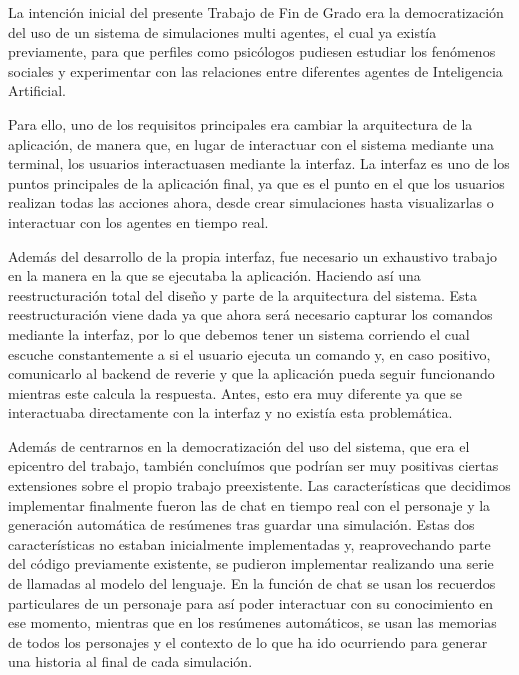 La intención inicial del presente Trabajo de Fin de Grado era la democratización del uso de un sistema de simulaciones multi agentes, el cual ya existía previamente, para que perfiles como psicólogos pudiesen estudiar los fenómenos sociales y experimentar con las relaciones entre diferentes agentes de Inteligencia Artificial.

Para ello, uno de los requisitos principales era cambiar la arquitectura de la aplicación, de manera que, en lugar de interactuar con el sistema mediante una terminal, los usuarios interactuasen mediante la interfaz. La interfaz es uno de los puntos principales de la aplicación final, ya que es el punto en el que los usuarios realizan todas las acciones ahora, desde crear simulaciones hasta visualizarlas o interactuar con los agentes en tiempo real.

Además del desarrollo de la propia interfaz, fue necesario un exhaustivo trabajo en la manera en la que se ejecutaba la aplicación. Haciendo así una reestructuración total del diseño y parte de la arquitectura del sistema. Esta reestructuración viene dada ya que ahora será necesario capturar los comandos mediante la interfaz, por lo que debemos tener un sistema corriendo el cual escuche constantemente a si el usuario ejecuta un comando y, en caso positivo, comunicarlo al backend de reverie y que la aplicación pueda seguir funcionando mientras este calcula la respuesta. Antes, esto era muy diferente ya que se interactuaba directamente con la interfaz y no existía esta problemática.

Además de centrarnos en la democratización del uso del sistema, que era el epicentro del trabajo, también concluímos que podrían ser muy positivas ciertas extensiones sobre el propio trabajo preexistente. Las características que decidimos implementar finalmente fueron las de chat en tiempo real con el personaje y la generación automática de resúmenes tras guardar una simulación. Estas dos características no estaban inicialmente implementadas y, reaprovechando parte del código previamente existente, se pudieron implementar realizando una serie de llamadas al modelo del lenguaje. En la función de chat se usan los recuerdos particulares de un personaje para así poder interactuar con su conocimiento en ese momento, mientras que en los resúmenes automáticos, se usan las memorias de todos los personajes y el contexto de lo que ha ido ocurriendo para generar una historia al final de cada simulación.

